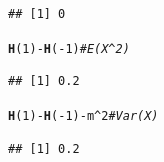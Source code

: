 \documentclass[twoside]{book}\usepackage[]{graphicx}\usepackage[]{xcolor}
\makeatletter
\newcommand{\hlnum}[1]{\textcolor[rgb]{0.686,0.059,0.569}{#1}}%
\newcommand{\hlcom}[1]{\textcolor[rgb]{0.678,0.584,0.686}{\textit{#1}}}%
\newcommand{\hlopt}[1]{\textcolor[rgb]{0,0,0}{#1}}%
\newcommand{\hlstd}[1]{\textcolor[rgb]{0.345,0.345,0.345}{#1}}%
\newcommand{\hlkwd}[1]{\textcolor[rgb]{0.737,0.353,0.396}{\textbf{#1}}}%
\newenvironment{kframe}{%
 \def\at@end@of@kframe{}%
 \ifinner\ifhmode%
  \def\at@end@of@kframe{\end{minipage}}%
  \begin{minipage}{\columnwidth}%
 \fi\fi%
 \def\FrameCommand##1{\hskip\@totalleftmargin \hskip-\fboxsep
 \colorbox{shadecolor}{##1}\hskip-\fboxsep
     \hskip-\linewidth \hskip-\@totalleftmargin \hskip\columnwidth}%
 \MakeFramed {\advance\hsize-\width
   \@totalleftmargin\z@ \linewidth\hsize
   \@setminipage}}%
 {\par\unskip\endMakeFramed%
 \at@end@of@kframe}
\newenvironment{knitrout}{}{} %
\makeatother
\begin{document}
\begin{solution}
\begin{knitrout}
\begin{kframe}
\begin{alltt}
\end{alltt}
\begin{verbatim}
## [1] 0
\end{verbatim}
\begin{alltt}
\hlkwd{H}\hlstd{(}\hlnum{1}\hlstd{)} \hlopt{-} \hlkwd{H}\hlstd{(}\hlopt{-}\hlnum{1}\hlstd{)}                       \hlcom{# E(X^2)}
\end{alltt}
\begin{verbatim}
## [1] 0.2
\end{verbatim}
\begin{alltt}
\hlkwd{H}\hlstd{(}\hlnum{1}\hlstd{)} \hlopt{-} \hlkwd{H}\hlstd{(}\hlopt{-}\hlnum{1}\hlstd{)} \hlopt{-} \hlstd{m}\hlopt{^}\hlnum{2}                 \hlcom{# Var(X)}
\end{alltt}
\begin{verbatim}
## [1] 0.2
\end{verbatim}
\end{kframe}
\end{knitrout}
\end{solution}
\end{document}
